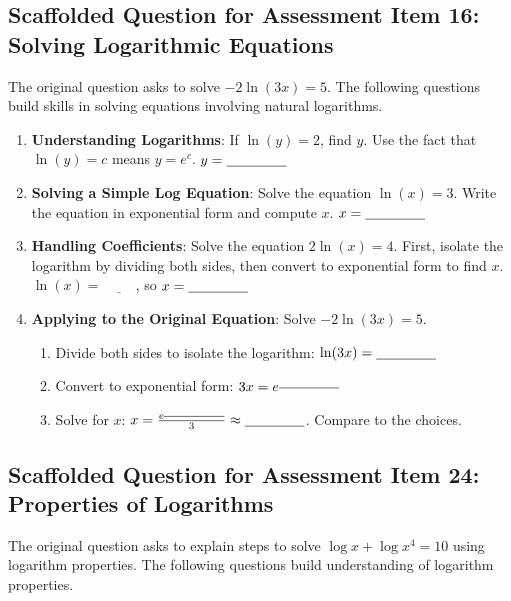 \documentclass[12pt]{article}
\begin{document}
\subsection*{Scaffolded Question for Assessment Item 16: Solving Logarithmic Equations}
The original question asks to solve \( -2 \ln (3x) = 5 \). The following questions build skills in solving equations involving natural logarithms.

\begin{enumerate}[label=16.\arabic*]
    \item \textbf{Understanding Logarithms}: If \( \ln(y) = 2 \), find \( y \). Use the fact that \( \ln(y) = c \) means \( y = e^c \). \(y = \underline{\hspace{1.5cm}}\)
    \item \textbf{Solving a Simple Log Equation}: Solve the equation \( \ln(x) = 3 \). Write the equation in exponential form and compute \( x \). \(x = \underline{\hspace{1.5cm}}\)
    \item \textbf{Handling Coefficients}: Solve the equation \( 2 \ln(x) = 4 \). First, isolate the logarithm by dividing both sides, then convert to exponential form to find \( x \).
    \( \ln(x) = \underline{\hspace{1cm}} \), so \( x = \underline{\hspace{1.5cm}} \)
    \item \textbf{Applying to the Original Equation}: Solve \( -2 \ln (3x) = 5 \).
    \begin{enumerate}[label=\alph*)]
        \item Divide both sides to isolate the logarithm: \( \ln(3x) = \underline{\hspace{1.5cm}} \)
        \item Convert to exponential form: \( 3x = e^{\underline{\hspace{1.5cm}}} \)
        \item Solve for \( x \): \( x = \frac{e^{\underline{\hspace{1.5cm}}}}{3} \approx \underline{\hspace{1.5cm}} \). Compare to the choices.
    \end{enumerate}
\end{enumerate}

\subsection*{Scaffolded Question for Assessment Item 24: Properties of Logarithms}
The original question asks to explain steps to solve \( \log x + \log x^4 = 10 \) using logarithm properties. The following questions build understanding of logarithm properties.
\end{document}
